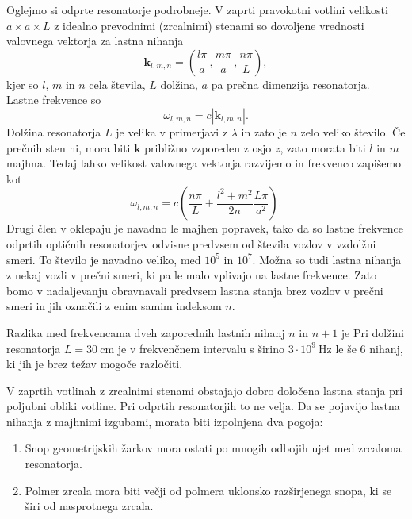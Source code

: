 Oglejmo si odprte resonatorje podrobneje. V zaprti pravokotni votlini velikosti
$a\times a\times L$ z idealno prevodnimi (zrcalnimi) stenami so dovoljene vrednosti
valovnega vektorja za lastna nihanja 
\begin{equation}
\mathbf{k}_{l,m,n}=\left(\frac{l\pi}{a}\,,\frac{m\pi}{a}\,,\frac{n\pi}{L}\right),\label{eq:k-votlina}
\end{equation}
 kjer so $l$, $m$ in $n$ cela števila, $L$ dolžina, $a$ pa prečna
dimenzija resonatorja. Lastne frekvence so 
\begin{equation}
\omega_{l,m,n}=c|\mathbf{k}_{l,m,n}|.\label{eq:omega-votlina}
\end{equation}
Dolžina resonatorja $L$ je velika v primerjavi z $\lambda$ in zato je $n$
zelo veliko število. Če prečnih sten ni, mora biti $\mathbf{k}$ približno
vzporeden z osjo $z$, zato morata biti $l$ in $m$ majhna. Tedaj
lahko velikost valovnega vektorja razvijemo in frekvenco zapišemo kot
\begin{equation}
\omega_{l,m,n}=c\left(\frac{n\pi}{L}+\frac{l^{2}+m^{2}}{2n}\frac{L \pi}{a^{2}}\right).
\label{eq:delta-omega-resonator-razvoj}
\end{equation}
Drugi člen v oklepaju je navadno le majhen popravek, tako da so
lastne frekvence odprtih optičnih resonatorjev odvisne predvsem od
števila vozlov v vzdolžni smeri. To število je navadno veliko, med $10^{5}$
in $10^{7}$. Možna so tudi lastna nihanja z nekaj vozli v prečni
smeri, ki pa le malo vplivajo na lastne frekvence. Zato bomo v nadaljevanju
obravnavali predvsem lastna stanja brez vozlov v prečni smeri in
jih označili z enim samim indeksom $n$.

Razlika med frekvencama dveh zaporednih lastnih nihanj 
$n$ in $n+1$ je
Pri dolžini resonatorja $L=30~\si{\centi\metre}$ je v frekvenčnem
intervalu s širino $3\cdot10^{9}~\si{\hertz}$ le še $6$ nihanj, ki jih
je brez težav mogoče razločiti.

V zaprtih votlinah z zrcalnimi stenami obstajajo dobro določena lastna
stanja pri poljubni obliki votline. Pri odprtih resonatorjih to ne velja.
Da se pojavijo lastna nihanja z majhnimi izgubami, morata
biti izpolnjena dva pogoja:

\begin{enumerate} 
\item Snop geometrijskih žarkov mora ostati po mnogih odbojih ujet med zrcaloma resonatorja.\\
\item Polmer zrcala mora biti večji od polmera uklonsko razširjenega snopa, ki se širi od nasprotnega zrcala. 
\end{enumerate}

